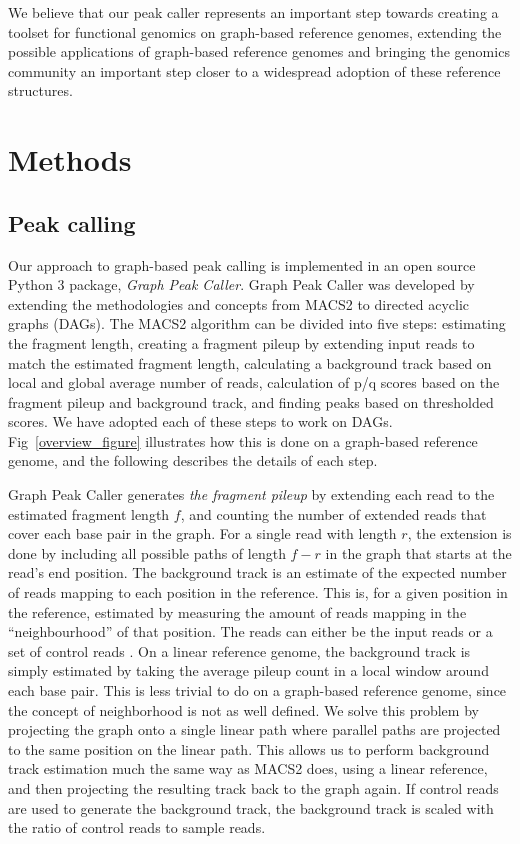 \documentclass[10pt,letterpaper]{article}
\begin{document}
We believe that our peak caller represents an important step towards creating a toolset for functional genomics on graph-based reference genomes, extending the possible applications of graph-based reference genomes and bringing the genomics community an important step closer to a widespread adoption of these reference structures.

\section*{Methods}
\subsection*{Peak calling}
Our approach to graph-based peak calling is implemented in an open source Python 3 package, \emph{Graph Peak Caller}. Graph Peak Caller was developed by extending the methodologies and concepts from MACS2 to directed acyclic graphs (DAGs). The MACS2 algorithm can be divided into five steps: estimating the fragment length, creating a fragment pileup by extending input reads to match the estimated fragment length, calculating a background track based on local and global average number of reads, calculation of p/q scores based on the fragment pileup and background track, and finding peaks based on thresholded scores. We have adopted each of these steps to work on DAGs. Fig~\ref{overview_figure} illustrates how this is done on a graph-based reference genome, and the following describes the details of each step.

Graph Peak Caller generates \emph{the fragment pileup} by extending each read to the estimated fragment length $f$, and counting the number of extended reads that cover each base pair in the graph. For a single read with length $r$, the extension is done by including all possible paths of length $f-r$ in the graph that starts at the read’s end position. 
The background track is an estimate of the expected number of reads mapping to each position in the reference. This is, for a given position in the reference, estimated by measuring the amount of reads mapping in the “neighbourhood” of that position. The reads can either be the input reads or a set of control reads . On a linear reference genome, the background track is simply estimated by taking the average pileup count in a local window around each base pair. This is less trivial to do on a graph-based reference genome, since the concept of neighborhood is not as well defined. We solve this problem by projecting the graph onto a single linear path where parallel paths are projected to the same position on the linear path. This allows us to perform background track estimation much the same way as MACS2 does, using a linear reference, and then projecting the resulting track back to the graph again. If control reads are used to generate the background track, the background track is scaled with the ratio of control reads to sample reads.
	
\end{document}
